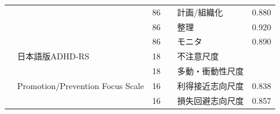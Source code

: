 \begin{landscape}
\begin{longtable}{p{2cm}p{2cm}p{2cm}p{6cm}p{2cm}p{2cm}}
		                         &                                  & 86  &                                                     & 計画/組織化               & 0.880      \\
		                         &                                  & 86  &                                                     & 整理                   & 0.920      \\
		                         &                                  & 86  &                                                     & モニタ                  & 0.890      \\
		                         & 日本語版ADHD-RS                      & 18  &                                                     & 不注意尺度                &            \\
		                         &                                  & 18  &                                                     & 多動・衝動性尺度             &            \\
		\textcite{Li202292}         & Promotion/Prevention Focus Scale & 16  &                                                     & 利得接近志向尺度             & 0.838      \\
		                         &                                  & 16  &                                                     & 損失回避志向尺度             & 0.857      \\ \hline
	\end{longtable}
\end{landscape}